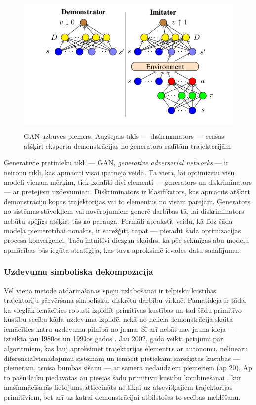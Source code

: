 \documentclass[12pt, a4paper]{article}
\numberwithin{equation}{section} %
\begin{document}
\begin{figure}[t!]
    \centering
    \includegraphics[height=7cm,page=1]{../img/GAN.png}
    \caption{GAN uzbūves piemērs. Augšējais tīkls --- diskriminators --- cenšas atšķirt eksperta demonstrācijas no ģeneratora radītām trajektorijām \cite{torabi2018generative}}
\end{figure}

Ģeneratīvie pretinieku tīkli --- GAN, \textit{generative adversarial networks} --- ir neironu tīkli, kas apmācīti visai īpatnējā veidā. Tā vietā, lai optimizētu visu modeli vienam mērķim, tiek izdalīti divi elementi --- ģenerators un diskriminators --- ar pretējiem uzdevumiem. Diskriminators ir klasifikators, kas apmācīts atšķirt demonstrāciju kopas trajektorijas vai to elementus no visām pārējām. Ģenerators no sistēmas stāvokļiem vai novērojumiem ģenerē darbības tā, lai diskriminators nebūtu spējīgs atšķirt tās no parauga. Formāli aprakstīt veidu, kā līdz šāda modeļa piemērotībai nonākts, ir sarežģīti, tāpat --- pierādīt šāda optimizācijas procesa konverģenci. Taču intuitīvi diezgan skaidrs, ka pēc sekmīgas abu modeļu apmācības būs iegūta stratēģija, kas tuvu aproksimē ievades datu sadalījumu.



\subsubsection{Uzdevumu simboliska dekompozīcija}

Vēl viena metode atdarināšanas spēju uzlabošanai ir telpisku kustības trajektoriju pārvēršana simbolisku, diskrētu darbību virknē. Pamatideja ir tāda, ka vieglāk iemācīties robusti izpidlīt primitīvas kustības un tad šādu primitīvo kustību secību kāda uzdevuma izpildē, nekā no neliela demonstrācija skaita iemācīties katru uzdevumu pilnībā no jauna. Šī arī nebūt nav jauna ideja --- izteikta jau 1980os un 1990os gados \cite{muench1994robot}. Jau 2002. gadā veikti pētījumi par algoritmiem, kas ļauj aproksimēt trajektorijas elementus ar autonomu, nelineāru diferenciālvienādojumu sistēmām \cite{ijspeert2002movement} un iemācīt pietiekami sarežģītas kustības --- piemēram, tenisa bumbas sišanu --- ar samērā nedaudziem piemēriem (ap 20). Ap to pašu laiku piedāvātas arī pieejas šādu primitīvu kustību kombinēšanai \cite{schaal2003computational}, kur mašīnmācīšanās lietojums attiecināts ne tikai uz atsevišķajiem trajektorijas primitīviem, bet arī uz katrai demonstrācijai atbilstošas to secības meklēšanu.
\end{document}
